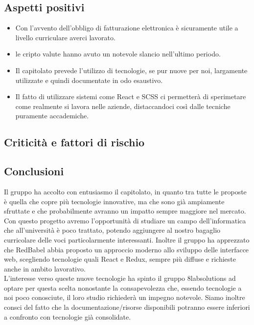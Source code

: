 \subsection{Aspetti positivi}
\begin{itemize}
	\item Con l'avvento dell'obbligo di fatturazione elettronica è sicuramente
	utile a livello curriculare averci lavorato.
	\item le cripto valute hanno avuto un notevole slancio nell'ultimo periodo.
	\item Il capitolato prevede l'utilizzo di tecnologie, se pur nuove per noi,
	largamente utilizzate e quindi documentate in odo esaustivo.
	\item Il fatto di utilizzare sistemi come React e SCSS ci permetterà di
	sperimetare come realmente si lavora nelle aziende, distaccandoci così dalle
	tecniche puramente accademiche.
\end{itemize}

\subsection{Criticità e fattori di rischio}

\subsection{Conclusioni} Il gruppo ha accolto con entusiasmo il capitolato, in quanto tra tutte le proposte è quella che copre più tecnologie innovative, ma che sono già ampiamente sfruttate e che probabilmente avranno un impatto sempre maggiore nel mercato. Con questo progetto avremo l'opportunità di studiare un campo dell'informatica che all'università è poco trattato, potendo aggiungere al nostro bagaglio curricolare delle voci particolarmente interessanti. Inoltre il gruppo ha apprezzato che RedBabel abbia proposto un approccio moderno allo sviluppo delle interfacce web, scegliendo tecnologie quali React e Redux, sempre più diffuse e richieste anche in ambito lavorativo.\\
 L'interesse verso queste nuove tecnologie ha spinto il gruppo 8labsolutions ad optare per questa scelta nonostante la consapevolezza che, essendo tecnologie a noi poco conosciute, il loro studio richiederà un impegno notevole. Siamo inoltre consci del fatto che la documentazione/risorse disponibili potranno essere inferiori a confronto con tecnologie già consolidate.